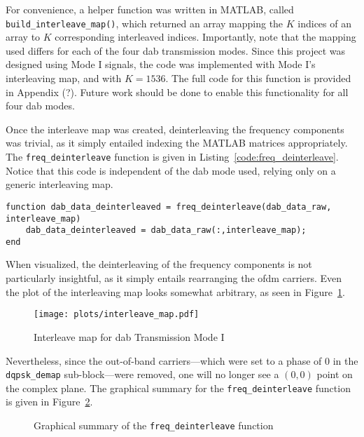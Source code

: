 \documentclass[class=report,11pt,crop=false]{standalone}
\begin{document}
For convenience, a helper function was written in MATLAB, called \texttt{build\_interleave\_map()}, which returned an array mapping the \(K\) indices of an array to \(K\) corresponding interleaved indices. Importantly, note that the mapping used differs for each of the four \gls{dab} transmission modes. Since this project was designed using Mode I signals, the code was implemented with Mode I's interleaving map, and with \(K = 1536\). The full code for this function is provided in Appendix (?). Future work should be done to enable this functionality for all four \gls{dab} modes.

Once the interleave map was created, deinterleaving the frequency components was trivial, as it simply entailed indexing the MATLAB matrices appropriately. The \texttt{freq\_deinterleave} function is given in Listing~\ref{code:freq_deinterleave}. Notice that this code is independent of the \gls{dab} mode used, relying only on a generic interleaving map.

\begin{lstlisting}[caption={MATLAB code for the frequency deinterleaving functionality.},label={code:freq_deinterleave}]
function dab_data_deinterleaved = freq_deinterleave(dab_data_raw, interleave_map)
    dab_data_deinterleaved = dab_data_raw(:,interleave_map);
end
\end{lstlisting}

When visualized, the deinterleaving of the frequency components is not particularly insightful, as it simply entails rearranging the \gls{ofdm} carriers. Even the plot of the interleaving map looks somewhat arbitrary, as seen in Figure~\ref{fig:interleave_map}.

\begin{figure}[htbp]
  \centering
  \captionsetup{type=figure}
  \texttt{[image: plots/interleave\_map.pdf]}
  \caption{Interleave map for \gls{dab} Transmission Mode I}
  \label{fig:interleave_map}
\end{figure}

Nevertheless, since the out-of-band carriers---which were set to a phase of 0 in the \texttt{dqpsk\_demap} sub-block---were removed, one will no longer see a \((0,0)\) point on the complex plane. The graphical summary for the \texttt{freq\_deinterleave} function is given in Figure~\ref{fig:freq_deinterleave}.

\begin{figure}[htbp]
  \centering
  \captionsetup{type=figure}
  \def\svgwidth{\linewidth}
  { %
      }
  \caption{Graphical summary of the \texttt{freq\_deinterleave} function}
  \label{fig:freq_deinterleave}
\end{figure}
\end{document}
